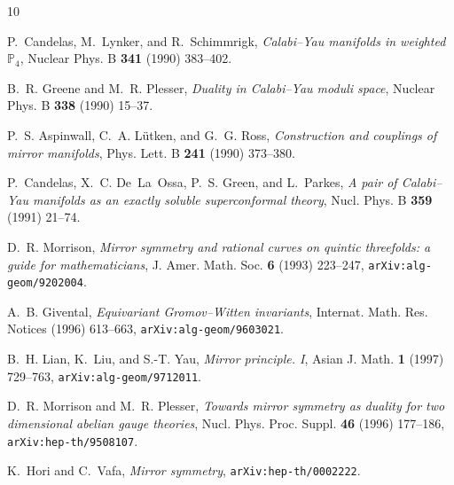 \newcommand{\refcno}[1]{}
\newcommand{\hyp}{-}
{}

\small


%
%
 
\ifx\undefined\bysame
\newcommand{\bysame}{\leavevmode\hbox to3em{\hrulefill}\,}
\fi
\begin{thebibliography}{10}
\renewcommand{\itemsep}{-.15cm}

P.~Candelas, M.~Lynker, and R.~Schimmrigk, {\em {C}alabi--{Y}au manifolds in
  weighted {$\mathbb P_4$}}, Nuclear Phys. B {\bf 341} (1990) 383--402.

B.~R. Greene and M.~R. Plesser, {\em Duality in {C}alabi--{Y}au moduli space},
  Nuclear Phys. B {\bf 338} (1990) 15--37.

P.~S. Aspinwall, C.~A. L\"utken, and G.~G. Ross, {\em Construction and
  couplings of mirror manifolds}, Phys. Lett. B {\bf 241} (1990) 373--380.

P.~Candelas, X.~C. De~La~Ossa, P.~S. Green, and L.~Parkes, {\em A pair of
  {C}alabi--{Y}au manifolds as an exactly soluble superconformal theory}, Nucl.
  Phys. B {\bf 359} (1991) 21--74.

D.~R. Morrison, {\em Mirror symmetry and rational curves on quintic threefolds:
  a guide for mathematicians}, J. Amer. Math. Soc. {\bf 6} (1993) 223--247,
  {\tt arXiv:alg-geom/9202004}.

A.~B. Givental, {\em Equivariant {G}romov--{W}itten invariants}, Internat.
  Math. Res. Notices (1996) 613--663, {\tt arXiv:alg-geom/9603021}.

B.~H. Lian, K.~Liu, and S.-T. Yau, {\em Mirror principle. {I}}, Asian J. Math.
  {\bf 1} (1997) 729--763, {\tt arXiv:alg-geom/9712011}.

D.~R. Morrison and M.~R. Plesser, {\em Towards mirror symmetry as duality for
  two dimensional abelian gauge theories}, Nucl. Phys. Proc. Suppl. {\bf 46}
  (1996) 177--186, {\tt arXiv:hep-th/9508107}.

K.~Hori and C.~Vafa, {\em Mirror symmetry}, {\tt arXiv:hep-th/0002222}.


\end{thebibliography}

